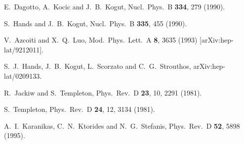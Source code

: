 \documentclass[12pt,a4paper]{article} \usepackage[latin1] {inputenc}
\begin{document}
\begin{thebibliography}{bib}
 E.~Dagotto, A.~Kocic and J.~B.~Kogut,
  Nucl.\ Phys.\ B {\bf 334}, 279 (1990).

 S.~Hands and J.~B.~Kogut,
  Nucl.\ Phys.\ B {\bf 335}, 455 (1990).

 V.~Azcoiti and X.~Q.~Luo,
  Mod.\ Phys.\ Lett.\ A {\bf 8}, 3635 (1993) [arXiv:hep-lat/9212011].

 S.~J.~Hands, J.~B.~Kogut, L.~Scorzato and
  C.~G.~Strouthos,
  arXiv:hep-lat/0209133.

 R.~Jackiw and S.~Templeton, Phys.\ Rev.\ D {\bf 23}, 10,
  2291 (1981).
  
 S.~Templeton, Phys.\ Rev.\ D {\bf 24}, 12, 3134 (1981).

 A.~I.~Karanikas, C.~N.~Ktorides and
  N.~G.~Stefanis,
  Phys.\ Rev.\ D {\bf 52}, 5898 (1995).
\end{thebibliography}
\end{document}
